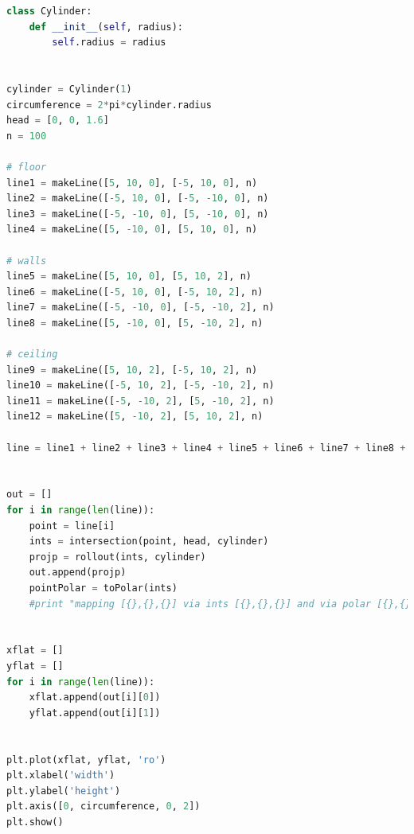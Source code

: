 \begin{lstlisting}[language=python]
class Cylinder:
    def __init__(self, radius):
        self.radius = radius


cylinder = Cylinder(1)
circumference = 2*pi*cylinder.radius
head = [0, 0, 1.6]
n = 100

# floor
line1 = makeLine([5, 10, 0], [-5, 10, 0], n)
line2 = makeLine([-5, 10, 0], [-5, -10, 0], n)
line3 = makeLine([-5, -10, 0], [5, -10, 0], n)
line4 = makeLine([5, -10, 0], [5, 10, 0], n)

# walls
line5 = makeLine([5, 10, 0], [5, 10, 2], n)
line6 = makeLine([-5, 10, 0], [-5, 10, 2], n)
line7 = makeLine([-5, -10, 0], [-5, -10, 2], n)
line8 = makeLine([5, -10, 0], [5, -10, 2], n)

# ceiling
line9 = makeLine([5, 10, 2], [-5, 10, 2], n)
line10 = makeLine([-5, 10, 2], [-5, -10, 2], n)
line11 = makeLine([-5, -10, 2], [5, -10, 2], n)
line12 = makeLine([5, -10, 2], [5, 10, 2], n)

line = line1 + line2 + line3 + line4 + line5 + line6 + line7 + line8 + line9 + line10 + line11 + line12


out = []
for i in range(len(line)):
    point = line[i]
    ints = intersection(point, head, cylinder)
    projp = rollout(ints, cylinder)
    out.append(projp)
    pointPolar = toPolar(ints)
    #print "mapping [{},{},{}] via ints [{},{},{}] and via polar [{},{},{}] to flat [{},{}]".format(point[0], point[1], point[2], ints[0], ints[1], ints[2], pointPolar[0], pointPolar[1], pointPolar[2], projp[0], projp[1])


xflat = []
yflat = []
for i in range(len(line)):
    xflat.append(out[i][0])
    yflat.append(out[i][1])


plt.plot(xflat, yflat, 'ro')
plt.xlabel('width')
plt.ylabel('height')
plt.axis([0, circumference, 0, 2])
plt.show()
\end{lstlisting}
